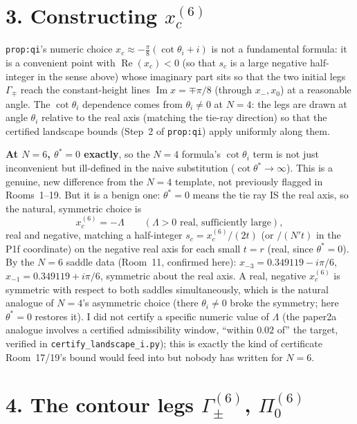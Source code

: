 \documentclass[11pt]{article}
\begin{document}
\section*{3. Constructing $x_c^{(6)}$}

\texttt{prop:qi}'s numeric choice $x_c\approx-\frac\pi8(\cot\theta_i+i)$ is not a fundamental formula:
it is a convenient point with $\operatorname{Re}(x_c)<0$ (so that $s_c$ is a large negative half-integer
in the sense above) whose imaginary part sits so that the two initial legs $\Gamma_\mp$ reach the
constant-height lines $\operatorname{Im}x=\mp\pi/8$ (through $x_-,x_0$) at a reasonable angle. The
$\cot\theta_i$ dependence comes from $\theta_i\ne0$ at $N=4$: the legs are drawn at angle $\theta_i$
relative to the real axis (matching the tie-ray direction) so that the certified landscape bounds
(Step~2 of \texttt{prop:qi}) apply uniformly along them.

\textbf{At $N=6$, $\theta^*=0$ exactly}, so the $N=4$ formula's $\cot\theta_i$ term is not just
inconvenient but ill-defined in the naive substitution ($\cot\theta^*\to\infty$). This is a genuine,
new difference from the $N=4$ template, not previously flagged in Rooms~1--19. But it is a benign one:
$\theta^*=0$ means the tie ray IS the real axis, so the natural, symmetric choice is
\[
   x_c^{(6)}=-\Lambda\qquad(\Lambda>0\text{ real, sufficiently large}),
\]
real and negative, matching a half-integer $s_c=x_c^{(6)}/(2t)$ (or $/(N't)$ in the P1f coordinate) on
the negative real axis for each small $t=r$ (real, since $\theta^*=0$). By the $N=6$ saddle data (Room~11,
confirmed here): $x_{-3}=0.349119-i\pi/6$, $x_{-1}=0.349119+i\pi/6$, symmetric about the real axis. A
real, negative $x_c^{(6)}$ is symmetric with respect to both saddles simultaneously, which is the
natural analogue of $N=4$'s asymmetric choice (there $\theta_i\ne0$ broke the symmetry; here $\theta^*=0$
restores it). I did not certify a specific numeric value of $\Lambda$ (the paper2a analogue involves
a certified admissibility window, ``within $0.02$ of'' the target, verified in
\texttt{certify\_landscape\_i.py}); this is exactly the kind of certificate Room~17/19's bound would
feed into but nobody has written for $N=6$.

\section*{4. The contour legs $\Gamma_\pm^{(6)}$, $\Pi_0^{(6)}$}
\end{document}

